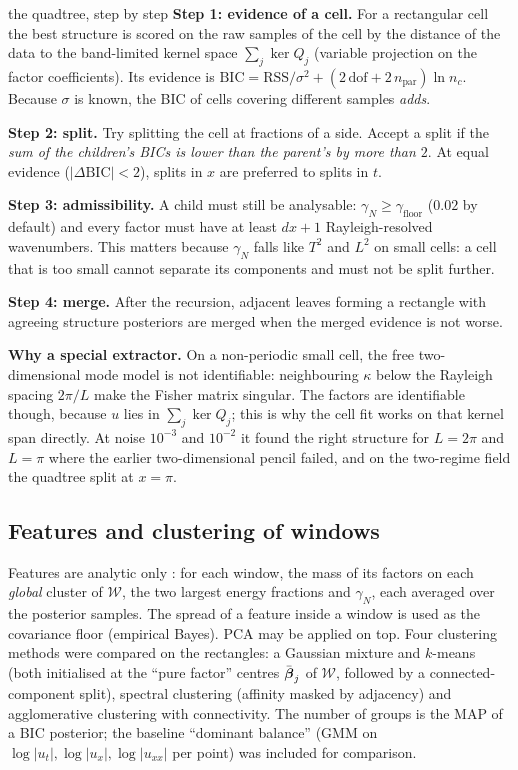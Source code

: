 \begin{explained}{the quadtree, step by step}
\textbf{Step 1: evidence of a cell.} For a rectangular cell the best structure is scored on the raw samples of the cell by the distance of the data to the band-limited kernel space $\sum_j\ker Q_j$ (variable projection on the factor coefficients). Its evidence is $\mathrm{BIC}=\mathrm{RSS}/\sigma^2+(2\,\mathrm{dof}+2\,n_{\mathrm{par}})\ln n_c$. Because $\sigma$ is known, the BIC of cells covering different samples \emph{adds}.

\medskip\textbf{Step 2: split.} Try splitting the cell at fractions of a side. Accept a split if the \emph{sum of the children's BICs is lower than the parent's by more than $2$}. At equal evidence ($|\Delta\mathrm{BIC}|<2$), splits in $x$ are preferred to splits in $t$.

\medskip\textbf{Step 3: admissibility.} A child must still be analysable: $\gamma_N\ge\gamma_{\mathrm{floor}}$ ($0.02$ by default) and every factor must have at least $dx+1$ Rayleigh-resolved wavenumbers. This matters because $\gamma_N$ falls like $T^2$ and $L^2$ on small cells: a cell that is too small cannot separate its components and must not be split further.

\medskip\textbf{Step 4: merge.} After the recursion, adjacent leaves forming a rectangle with agreeing structure posteriors are merged when the merged evidence is not worse.

\medskip\textbf{Why a special extractor.} On a non-periodic small cell, the free two-dimensional mode model is not identifiable: neighbouring $\kappa$ below the Rayleigh spacing $2\pi/L$ make the Fisher matrix singular. The factors are identifiable though, because $u$ lies in $\sum_j\ker Q_j$; this is why the cell fit works on that kernel span directly. At noise $10^{-3}$ and $10^{-2}$ it found the right structure for $L=2\pi$ and $L=\pi$ where the earlier two-dimensional pencil failed, and on the two-regime field the quadtree split at $x=\pi$.
\end{explained}

\subsection{Features and clustering of windows}
Features are analytic only : for each window, the mass of its factors on each \emph{global} cluster of $\mathcal W$, the two largest energy fractions and $\gamma_N$, each averaged over the posterior samples. The spread of a feature inside a window is used as the covariance floor (empirical Bayes). PCA may be applied on top. Four clustering methods were compared on the rectangles: a Gaussian mixture and $k$-means (both initialised at the ``pure factor'' centres $\bar{\boldsymbol\beta}_j$ of $\mathcal W$, followed by a connected-component split), spectral clustering (affinity masked by adjacency) and agglomerative clustering with connectivity. The number of groups is the MAP of a BIC posterior; the baseline ``dominant balance'' (GMM on $\log|u_t|,\log|u_x|,\log|u_{xx}|$ per point) was included for comparison.

